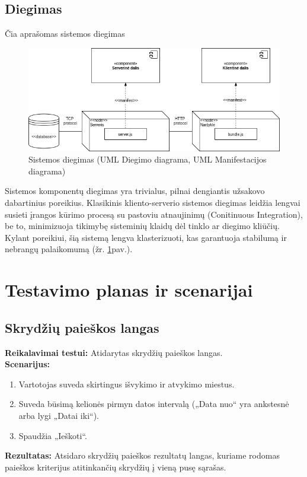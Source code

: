 \documentclass{VUMIFPSkursinis}
\begin{document}
      \subsection{Diegimas}
      Čia aprašomas sistemos diegimas
        \begin{figure}[H]
          \centering
          \includegraphics[scale=0.7]{img/Diegimas}
          \caption{Sistemos diegimas (UML Diegimo diagrama, UML Manifestacijos diagrama)}
          \label{deployment}
        \end{figure}
        Sistemos komponentų diegimas yra trivialus, pilnai dengiantis užsakovo dabartinius poreikius. Klasikinis kliento-serverio sistemos diegimas leidžia lengvai susieti įrangos kūrimo procesą su pastoviu atnaujinimų (Conitinuous Integration), be to, minimizuoja tikimybę sisteminių klaidų dėl tinklo ar diegimo kliūčių. Kylant poreikiui, šią sistemą lengva klasterizuoti, kas garantuoja stabilumą ir nebrangų palaikomumą (žr. \ref{deployment}pav.).
    \section{Testavimo planas ir scenarijai}
        \subsection{Skrydžių paieškos langas}
            \noindent\textbf{Reikalavimai testui:} Atidarytas skrydžių paieškos langas. \\

            \noindent\textbf{Scenarijus:}
                \begin{enumerate}
                    \item Vartotojas suveda skirtingus išvykimo ir atvykimo miestus.
                    \item Suveda būsimą kelionės pirmyn datos intervalą („Data nuo“ yra ankstesnė arba lygi „Datai iki“).
                    \item Spaudžia „Ieškoti“.
                \end{enumerate}
            \textbf{Rezultatas:} Atsidaro skrydžių paieškos rezultatų langas, kuriame rodomas paieškos kriterijus atitinkančių skrydžių į vieną pusę sąrašas.\\
\end{document}
